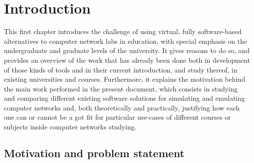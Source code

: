 
\chapter{Introduction}
\label{ch:introduction}

This first chapter introduces the challenge of using virtual, fully software-based alternatives to computer network labs in education, with special emphasis on the undergraduate and graduate levels of the university. %
It gives reasons to do so, and provides an overview of the work that has already been done both in development of those kinds of tools and in their current introduction, and study thereof, in existing universities and courses.
Furthermore, it explains the motivation behind the main work performed in the present document, which consists in studying and comparing different existing software solutions for simulating and emulating computer networks and, both theoretically and practically, justifying how each one can or cannot be a got fit for particular use-cases of different courses or subjects inside computer networks studying.


\section{Motivation and problem statement}
\label{sec:motivation}

